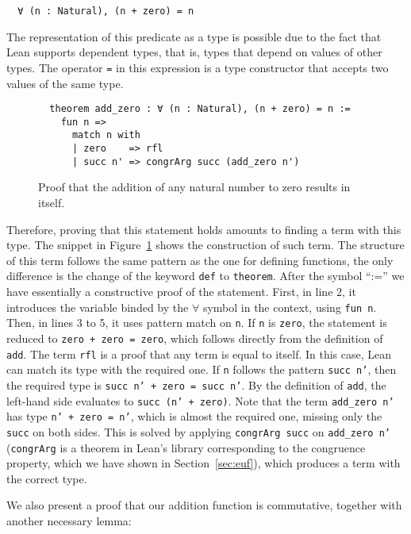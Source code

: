 \begin{verbatim}
  ∀ (n : Natural), (n + zero) = n
\end{verbatim}

The representation of this predicate as a type is possible due to the fact that Lean supports dependent types, that is, types that depend on values of other types. The operator \texttt{=} in this expression is a type constructor that accepts two values of the same type.


\begin{figure}[t]
\begin{verbatim}
  theorem add_zero : ∀ (n : Natural), (n + zero) = n :=
    fun n =>
      match n with
      | zero    => rfl
      | succ n' => congrArg succ (add_zero n')
\end{verbatim}
\caption{Proof that the addition of any natural number to zero results in itself.}\label{addZero}
\end{figure}

Therefore, proving that this statement holds amounts to finding a term with this type. The snippet in Figure~\ref{addZero} shows the construction of such term.
The structure of this term follows the same pattern as the one for defining functions, the only difference is the change of the keyword \texttt{def} to \texttt{theorem}. After the symbol ``:='' we have essentially a constructive proof of the statement. First, in line 2, it introduces the variable binded by the $\forall$ symbol in the context, using \texttt{fun n}. Then, in lines 3 to 5, it uses pattern match on \texttt{n}. If \texttt{n} is \texttt{zero}, the statement is reduced to \texttt{zero + zero = zero}, which follows directly from the definition of \texttt{add}. The term \texttt{rfl} is a proof that any term is equal to itself. In this case, Lean can match its type with the required one. If \texttt{n} follows the pattern \texttt{succ n'}, then the required type is \texttt{succ n' + zero = succ n'}. By the definition of \texttt{add}, the left-hand side evaluates to \texttt{succ (n' + zero)}.
Note that the term \texttt{add\_zero n'} has type \texttt{n' + zero = n'}, which is almost the required one, missing only the \texttt{succ} on both sides. This is solved by applying \texttt{congrArg succ} on \texttt{add\_zero n'} (\texttt{congrArg} is a theorem in Lean's library corresponding to the congruence property, which we have shown in Section~\ref{sec:euf}), which produces a term with the correct type.


We also present a proof that our addition function is commutative, together with another necessary lemma:

